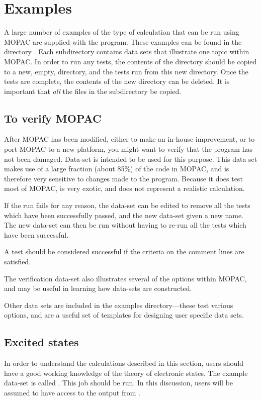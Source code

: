 \chapter{Examples}\label{examples}
A large number of examples of the type of calculation that can be run using
MOPAC are supplied with the program.  These examples can be found in the
directory .  Each subdirectory contains data sets
that  illustrate one topic within MOPAC. In order to run any tests, the
contents of the directory should be copied to a new, empty, directory, and the
tests run from this new directory.  Once the tests are complete, the contents
of the new directory can be deleted.  It is important that {\em all} the files
in the   subdirectory be copied.

\section{To verify MOPAC}
After MOPAC has been modified, either to make an in-house improvement, or to
port MOPAC to a new platform, you might want to verify that the program has not
been damaged.  Data-set  is intended to be used for this
purpose.  This data set makes use of a large fraction (about 85\%) of the code
in MOPAC, and is therefore very sensitive to changes made to the program.
Because it does test most of MOPAC,  is very exotic, and does
not represent a realistic calculation.

If the run fails for any reason, the data-set can be edited to remove all the
tests which have been successfully passed, and the new data-set given a new
name.  The new data-set can then be run without having to re-run all the tests
which have been successful.

A test should be considered successful if the criteria on the comment lines
are satisfied.  

The verification data-set also illustrates several of the options within MOPAC,
and may be useful in learning how data-sets are constructed.

Other data sets are included in the examples directory---these test various
options, and are a useful set of templates for designing user specific data
sets.

\section{Excited states}
In order to understand the calculations described in this section, users
should have a good working knowledge of the theory of electronic states.
The example data-set is called .  This job should be run.
In this discussion, users will be assumed to have access to the output
from .

